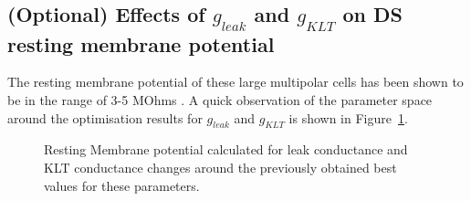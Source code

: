 


\subsection{(Optional) Effects of $g_{leak}$ and $g_{KLT}$ on DS resting membrane potential}    \label{sec:DS:effects-g_leak-g_lkt}



The resting membrane potential of these large multipolar cells has been shown to
be in the range of 3-5 MOhms . A quick
observation of the parameter space around the optimisation results for
$g_{leak}$ and $g_{KLT}$ is shown in Figure~\ref{fig:leakVltk}.

\begin{figure}[htb]
  \centering 
{}
\caption[DS RMP dynamics]{Resting Membrane potential calculated for leak
  conductance and KLT conductance changes around the previously obtained best
  values for these parameters.}    \label{fig:leakVltk}
\end{figure}



